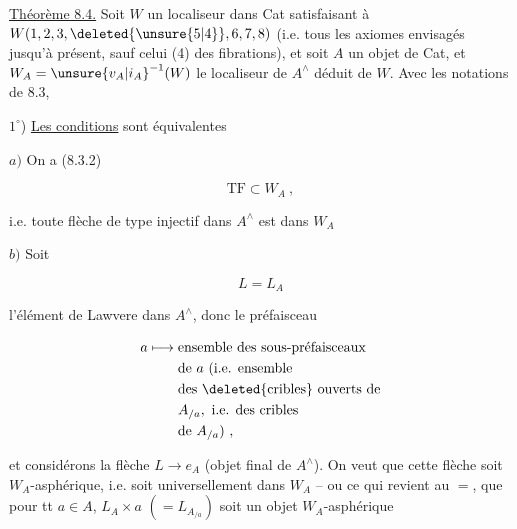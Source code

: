 
\uline{Théorème 8.4.} Soit $W$ un localiseur  dans Cat
satisfaisant à $W(1,2,3,\deleted{\unsure{5|4}},6,7,8)$  (i.e. tous les
axiomes envisagés jusqu'à présent, sauf  celui
(4) des fibrations),
et soit $A$ un objet de Cat, et $W_A=\unsure{v_A|i_A}^{-1}(W)$ le localiseur
de $A^\wedge$ déduit de $W$. Avec les notations de 8.3,


\textcircled{$1^\circ$}) \uline{Les conditions}  sont équivalentes

$a)$ On a (8.3.2)

\[
 \mathrm{TF}\subset W_A\ ,
\]

i.e. toute flèche de type injectif dans $A^\wedge$ est dans $W_A$

$b)$ Soit

\[
 L=L_A \tag*{(8.4.1)}
\]

l'élément de Lawvere dans $A^\wedge$, donc le préfaisceau

\[
 \begin{aligned}
 a\longmapsto{}&\text{ensemble des sous-préfaisceaux}\\
 &\text{de } a\ \text{(i.e. ensemble}\\
 &\text{des \deleted{cribles} ouverts de}\\
 & A_{/a},\ \text{i.e. des cribles}\\
 &\text{de } A_{/a})\ ,
 \end{aligned}
\]

et considérons la flèche $L\longrightarrow e_A$ (objet final de $A^\wedge$). On veut que cette flèche soit 
$W_A$-asphérique, i.e. soit universellement dans $W_A$ -- ou ce qui revient au $=$, que pour tt $a\in A$, $L_A\times a$
$(=L_{A_{/a}})$ soit un objet $W_A$-asphérique
